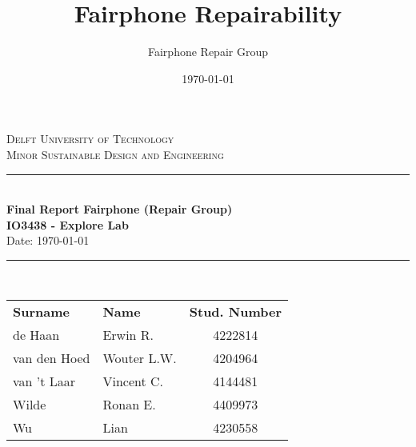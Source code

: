 \documentclass[final,a4paper]{report}
\author{Fairphone Repair Group}
\title{Fairphone Repairability}
\date{\today}
\begin{document}
\begin{titlepage}
\begin{center}
\textsc{\LARGE Delft University of Technology }\\[0.3cm]
\textsc{\Large Minor Sustainable Design and Engineering}\\[0.5cm]

\rule{\linewidth}{0.04cm} \\[0.4cm]
{\LARGE \bfseries Final Report Fairphone (Repair Group)\\[0.2cm]}
{\large \bfseries IO3438 - Explore Lab}\\ \vspace{5mm}
Date: \today \\
\rule{\linewidth}{0.04cm} \\[0.9cm]

\vspace{50 mm}

\begin{table}[H]
\centering
\begin{tabular}{| l l c}
\textbf{Surname} & \textbf{Name} & \textbf{Stud. Number} \\
de Haan & Erwin R.& 4222814 \\
van den Hoed & Wouter L.W. & 4204964 \\
van 't Laar & Vincent C. & 4144481 \\
Wilde & Ronan E.& 4409973 \\
Wu & Lian & 4230558 \\

\end{tabular}
\end{table}



\end{center}
\end{titlepage}
\end{document}
